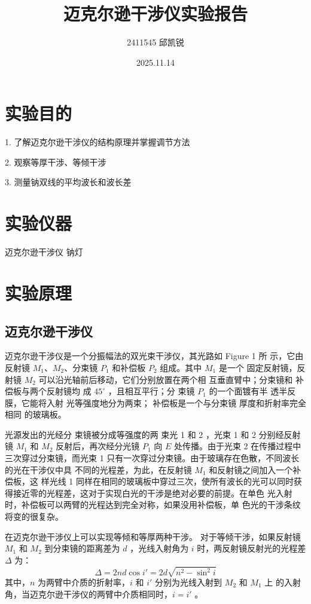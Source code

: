 \documentclass[12pt]{article}
\title{迈克尔逊干涉仪实验报告}
\author{2411545 邱凯锐}
\date{2025.11.14}
\begin{document}
\maketitle

\section{实验目的}
1. 了解迈克尔逊干涉仪的结构原理并掌握调节方法 

2. 观察等厚干涉、等倾干涉

3.  测量钠双线的平均波长和波长差

\section{实验仪器}
迈克尔逊干涉仪  钠灯

\section{实验原理}

\subsection{迈克尔逊干涉仪}

迈克尔逊干涉仪是一个分振幅法的双光束干涉仪，其光路如 Figure 1 所
示，它由反射镜 $M_1$、$M_2$、分束镜 $P_1$ 和补偿板 $P_2$ 组成。其中 $M_1$ 是一个
固定反射镜，反射镜 $M_2$ 可以沿光轴前后移动，它们分别放置在两个相
互垂直臂中；分束镜和
补偿板与两个反射镜均
成 $45^\circ$ ，且相互平行；分
束镜 $P_1$ 的一个面镀有半
透半反膜，它能将入射
光等强度地分为两束；
补偿板是一个与分束镜
厚度和折射率完全相同
的玻璃板。

光源发出的光经分
束镜被分成等强度的两
束光 1 和 2 ，光束 1 和 2 分别经反射镜 $M_1$ 和 $M_2$ 反射后，再次经分光镜
$P_1$ 向 $E$ 处传播。由于光束 2 在传播过程中三次穿过分束镜，而光束 1
只有一次穿过分束镜。由于玻璃存在色散，不同波长的光在干涉仪中具
不同的光程差，为此，在反射镜 $M_1$ 和反射镜之间加入一个补偿板，这
样光线 1 同样在相同的玻璃板中穿过三次，使所有波长的光可以同时获
得接近零的光程差，这对于实现白光的干涉是绝对必要的前提。在单色
光入射时，补偿板可以两臂的光程达到完全对称，如果没用补偿板，单
色光的干涉条纹将变的很复杂。 

在迈克尔逊干涉仪上可以实现等倾和等厚两种干涉。
对于等倾干涉，如果反射镜 $M_1$ 和 $M_2$ 到分束镜的距离差为 $d$ ，光线入射角为 $i$ 时，两反射镜反射光的光程差 $\Delta$ 为：
\begin{equation}
    \Delta=2nd\cos i'=2d\sqrt{n^2-\sin^2i}
\end{equation}
其中，$n$ 为两臂中介质的折射率，$i$ 和 $i'$ 分别为光线入射到 $M_2$ 和 $M_1$ 上
的入射角，当迈克尔逊干涉仪的两臂中介质相同时，$i=i'$ 。
\end{document}
